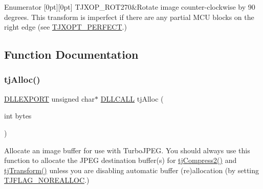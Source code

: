 \begin{DoxyEnumFields}{Enumerator}
[0pt][0pt]{}\mbox{\label{group___turbo_j_p_e_g_gga2de531af4e7e6c4f124908376b354866a3064ee5dfb7f032df332818587567a08}} 
T\+J\+X\+O\+P\+\_\+\+R\+O\+T270&Rotate image counter-\/clockwise by 90 degrees. This transform is imperfect if there are any partial M\+CU blocks on the right edge (see \hyperlink{group___turbo_j_p_e_g_ga50e03cb5ed115330e212417429600b00}{T\+J\+X\+O\+P\+T\+\_\+\+P\+E\+R\+F\+E\+CT}.) \\
\hline

\end{DoxyEnumFields}


\subsection{Function Documentation}
\mbox{\label{group___turbo_j_p_e_g_ga5c9234bda6d993cdaffdd89bf81a00ff}} 
\subsubsection{\texorpdfstring{tj\+Alloc()}{tjAlloc()}}
{\footnotesize\ttfamily \hyperlink{turbojpeg_8h_a808e08638be3cba36e36759e5b150de0}{D\+L\+L\+E\+X\+P\+O\+RT} unsigned char$\ast$ \hyperlink{turbojpeg_8h_a54b25836118bfac94a53a7b790f3ccb2}{D\+L\+L\+C\+A\+LL} tj\+Alloc (\begin{DoxyParamCaption}\item[{int}]{bytes }\end{DoxyParamCaption})}

Allocate an image buffer for use with Turbo\+J\+P\+EG. You should always use this function to allocate the J\+P\+EG destination buffer(s) for \hyperlink{group___turbo_j_p_e_g_gaba62b7a98f960839b588579898495cf2}{tj\+Compress2()} and \hyperlink{group___turbo_j_p_e_g_gae403193ceb4aafb7e0f56ab587b48616}{tj\+Transform()} unless you are disabling automatic buffer (re)allocation (by setting \hyperlink{group___turbo_j_p_e_g_ga8808d403c68b62aaa58a4c1e58e98963}{T\+J\+F\+L\+A\+G\+\_\+\+N\+O\+R\+E\+A\+L\+L\+OC}.)


